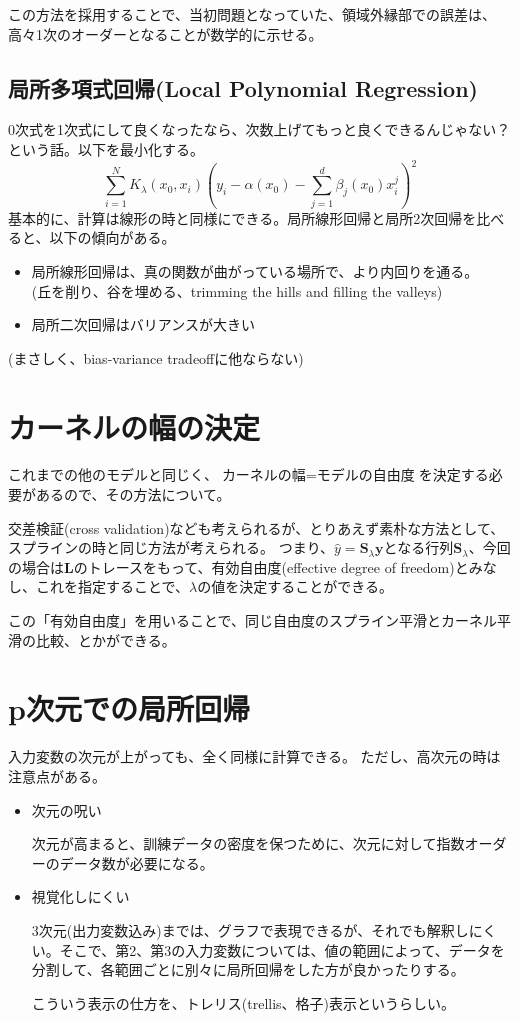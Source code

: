 \documentclass[uplatex]{jsarticle}
\begin{document}
この方法を採用することで、当初問題となっていた、領域外縁部での誤差は、高々1次のオーダーとなることが数学的に示せる。

\subsection{局所多項式回帰(Local Polynomial Regression)}
0次式を1次式にして良くなったなら、次数上げてもっと良くできるんじゃない？という話。以下を最小化する。
\[
  \sum_{i=1}^{N}K_{\lambda}(x_{0},x_{i}) \left (y_{i}- \alpha (x_{0})- \sum_{j=1}^{d}\beta_{j} (x_{0})x_{i}^{j} \right )^{2}
\]
基本的に、計算は線形の時と同様にできる。局所線形回帰と局所2次回帰を比べると、以下の傾向がある。
\begin{itemize}
  \item 局所線形回帰は、真の関数が曲がっている場所で、より内回りを通る。\\(丘を削り、谷を埋める、trimming the hills and filling the valleys)
  \item 局所二次回帰はバリアンスが大きい
\end{itemize}
(まさしく、bias-variance tradeoffに他ならない)

\section{カーネルの幅の決定}
これまでの他のモデルと同じく、$\mbox{カーネルの幅}=\mbox{モデルの自由度}$を決定する必要があるので、その方法について。

交差検証(cross validation)なども考えられるが、とりあえず素朴な方法として、スプラインの時と同じ方法が考えられる。
つまり、$\hat{y}=\mathbf{S}_{\lambda}\mathbf{y}$となる行列$\mathbf{S}_{\lambda}$、今回の場合は$\mathbf{L}$のトレースをもって、有効自由度(effective degree of freedom)とみなし、これを指定することで、$\lambda$の値を決定することができる。

この「有効自由度」を用いることで、同じ自由度のスプライン平滑とカーネル平滑の比較、とかができる。

\section{p次元での局所回帰}
入力変数の次元が上がっても、全く同様に計算できる。
ただし、高次元の時は注意点がある。
\begin{itemize}
  \item 次元の呪い

  次元が高まると、訓練データの密度を保つために、次元に対して指数オーダーのデータ数が必要になる。

  \item 視覚化しにくい

  3次元(出力変数込み)までは、グラフで表現できるが、それでも解釈しにくい。そこで、第2、第3の入力変数については、値の範囲によって、データを分割して、各範囲ごとに別々に局所回帰をした方が良かったりする。

  こういう表示の仕方を、トレリス(trellis、格子)表示というらしい。
\end{itemize}
\end{document}
